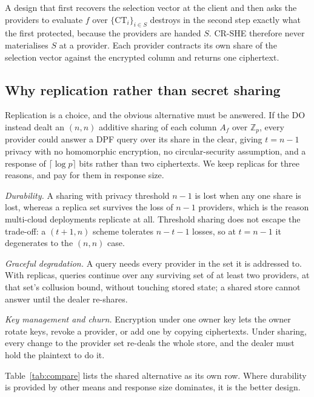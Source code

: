 \documentclass[a4paper,fleqn]{cas-dc}
\begin{document}
A design that first recovers the selection vector at the client and then asks
the providers to evaluate $f$ over $\{\text{CT}_i\}_{i\in S}$ destroys in the
second step exactly what the first protected, because the providers are handed
$S$. CR-SHE therefore never materialises $S$ at a provider. Each provider
contracts its own share of the selection vector against the encrypted column
and returns one ciphertext.

\subsection{Why replication rather than secret sharing}
\label{sec:whyrep}
Replication is a choice, and the obvious alternative must be answered. If the
DO instead dealt an $(n,n)$ additive sharing of each column $A_f$ over
$\mathbb{Z}_p$, every provider could answer a DPF query over its share in the
clear, giving $t=n-1$ privacy with no homomorphic encryption, no
circular-security assumption, and a response of $\lceil\log p\rceil$ bits
rather than two ciphertexts. We keep replicas for three reasons, and pay for
them in response size.

\emph{Durability.} A sharing with privacy threshold $n-1$ is lost when any one
share is lost, whereas a replica set survives the loss of $n-1$ providers,
which is the reason multi-cloud deployments replicate at all. Threshold
sharing does not escape the trade-off: a $(t{+}1,n)$ scheme tolerates
$n-t-1$ losses, so at $t=n-1$ it degenerates to the $(n,n)$ case.

\emph{Graceful degradation.} A query needs every provider in the set it is
addressed to. With replicas, queries continue over any surviving set of at
least two providers, at that set's collusion bound, without touching stored
state; a shared store cannot answer until the dealer re-shares.

\emph{Key management and churn.} Encryption under one owner key lets the owner
rotate keys, revoke a provider, or add one by copying ciphertexts. Under
sharing, every change to the provider set re-deals the whole store, and the
dealer must hold the plaintext to do it.

Table~\ref{tab:compare} lists the shared alternative as its own row. Where
durability is provided by other means and response size dominates, it is the
better design.
\end{document}
